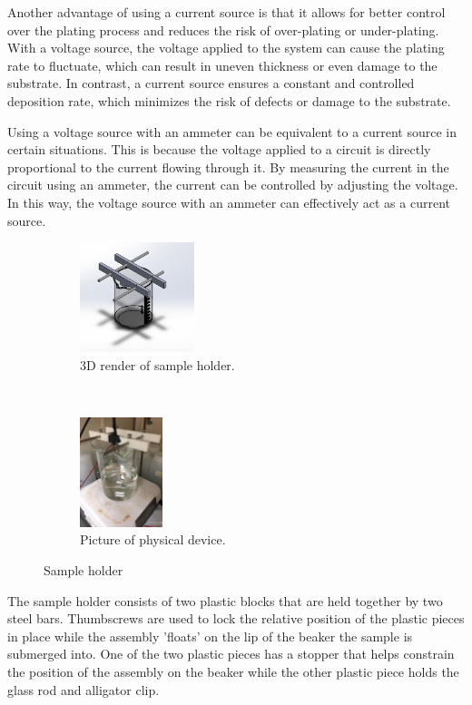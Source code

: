 Another advantage of using a current source is that it allows for better control over the plating process and reduces the risk of over-plating or under-plating. With a voltage source, the voltage applied to the system can cause the plating rate to fluctuate, which can result in uneven thickness or even damage to the substrate. In contrast, a current source ensures a constant and controlled deposition rate, which minimizes the risk of defects or damage to the substrate.

Using a voltage source with an ammeter can be equivalent to a current source in certain situations. This is because the voltage applied to a circuit is directly proportional to the current flowing through it. By measuring the current in the circuit using an ammeter, the current can be controlled by adjusting the voltage. In this way, the voltage source with an ammeter can effectively act as a current source.


\begin{figure}
    \centering
    \begin{subfigure}{0.35\textwidth}
        \centering
        \includegraphics[height=3.2cm]{Main/Ch1/electroplating_setup.png}
        \caption{3D render of sample holder.}
    \end{subfigure}
    ~
    \begin{subfigure}{0.25\textwidth}
        \centering
        \includegraphics[height=3.2cm]{Main/Ch1/electroplating_setup_picture.png}
        \caption{Picture of physical device.}
    \end{subfigure}
    \caption{Sample holder}
\end{figure}

The sample holder consists of two plastic blocks that are held together by two steel bars. Thumbscrews are used to lock the relative position of the plastic pieces in place while the assembly 'floats'  on the lip of the beaker the sample is submerged into. One of the two plastic pieces has a stopper that helps constrain the position of the assembly on the beaker while the other plastic piece holds the glass rod and alligator clip.

